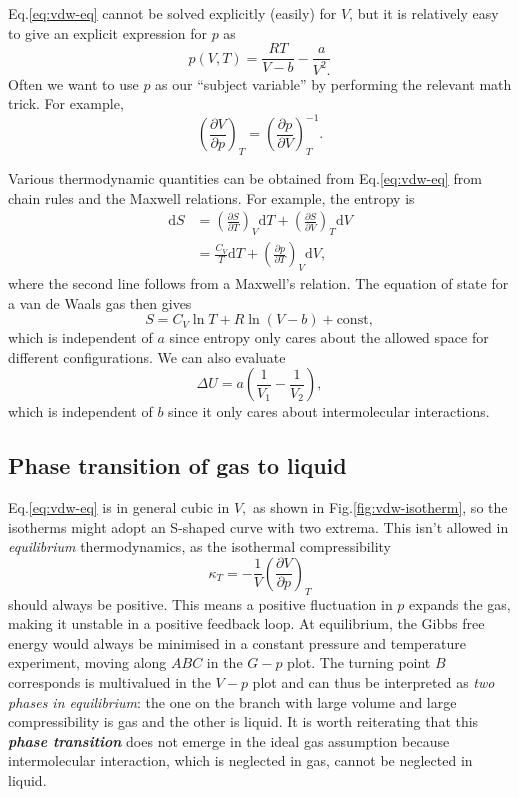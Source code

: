 \documentclass{article}
\theoremstyle{nonumberplain}
\begin{document}
Eq.\eqref{eq:vdw-eq} cannot be solved explicitly (easily) for $V$, but it is relatively easy to give an explicit expression for $p$ as 
\[
    p(V,T) = \frac{RT}{V-b} - \frac{a}{V^{2}.}
\]
Often we want to use $p$ as our ``subject variable'' by performing the relevant math trick. For example, 
\[
    \left( \frac{\partial V}{\partial p} \right)_{T} = 
    \left( \frac{\partial p}{\partial V} \right)_{T} ^{-1}.
\]

Various thermodynamic quantities can be obtained from Eq.\eqref{eq:vdw-eq} from chain rules and the Maxwell relations. For example, the entropy is
\[
    \begin{aligned}
        \mathrm{d}S &= \left(\frac{\partial S}{\partial T}  \right)_V \mathrm{d}T + \left(\frac{\partial S}{\partial V}  \right)_T \mathrm{d}V  \\
        &= \frac{C_V}{T}\mathrm{d} T + \left(\frac{\partial p}{\partial T}  \right)_V \mathrm{d}V,
    \end{aligned}
\]
where the second line follows from a Maxwell's relation. The equation of state for a van de Waals gas then gives
\[
    S = C_V \ln T + R \ln (V -b) + \mathrm{const},
\]
which is independent of $a$ since entropy only cares about the allowed space for different configurations. We can also evaluate 
\[
    \Delta U = a \left( \frac{1}{V_1} - \frac{1}{V_2}\right),
\]
which is independent of $b$ since it only cares about intermolecular interactions. 

\subsection{Phase transition of gas to liquid}
Eq.\eqref{eq:vdw-eq} is in general cubic in $V,$ as shown in Fig.\ref{fig:vdw-isotherm}, so the isotherms might adopt an S-shaped curve with two extrema. This isn't allowed in \textit{equilibrium} thermodynamics, as the isothermal compressibility 
\[
    \kappa_T = - \frac{1}{V}\left(\frac{\partial V}{\partial p} \right)_T
\]
should always be positive. This means a positive fluctuation in $p$ expands the gas, making it unstable in a positive feedback loop. At equilibrium, the Gibbs free energy would always be minimised in a constant pressure and temperature experiment, moving along $ABC$ in the $G-p$ plot. The turning point $B$ corresponds is multivalued in the $V-p$ plot and can thus be interpreted as \textit{two phases in equilibrium}: the one on the branch with large volume and large compressibility is gas and the other is liquid. It is worth reiterating that this \textit{\textbf{phase transition}} does not emerge in the ideal gas assumption because intermolecular interaction, which is neglected in gas, cannot be neglected in liquid. 
\end{document}
